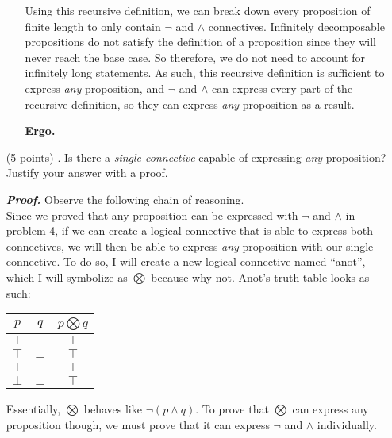 \documentclass[11pt,a4paper]{article}
\begin{document}
\begin{enumerate}
\begin{enumerate}
        Using this recursive definition, we can break down every proposition of finite length to only contain $\neg$ and $\land$ connectives. Infinitely decomposable propositions do not satisfy the definition of a proposition since they will never reach the base case. So therefore, we do not need to account for infinitely long statements. As such, this recursive definition is sufficient to express \emph{any} proposition, and $\neg$ and $\land$ can express every part of the recursive definition, so they can express \emph{any} proposition as a result.
        \begin{flushright}
            \textbf{Ergo.}
        \end{flushright}
        \end{enumerate}
    \item[(5 points) \quad 5.]
    Is there a \emph{single connective} capable of expressing \emph{any} proposition? Justify your answer with a proof.

    \emph{\textbf{Proof.}} Observe the following chain of reasoning. \\
    Since we proved that any proposition can be expressed with $\neg$ and $\land$ in problem 4, if we can create a logical connective that is able to express both connectives, we will then be able to express \emph{any} proposition with our single connective. To do so, I will create a new logical connective named ``anot'', which I will symbolize as $\bigotimes$ because why not. Anot's truth table looks as such: 
    \begin{center}
        \begin{tabular}{||c c c||}
            \hline
            $p$ & $q$ & $p \bigotimes q$ \\
            \hline \hline
            $\top$ & $\top$ & $\bot$ \\
            \hline
            $\top$ & $\bot$ & $\top$ \\
            \hline
            $\bot$ & $\top$ & $\top$ \\
            \hline
            $\bot$ & $\bot$ & $\top$ \\
            \hline
        \end{tabular}
    \end{center}    
    Essentially, $\bigotimes$ behaves like $\neg (p \land q)$. To prove that $\bigotimes$ can express any proposition though, we must prove that it can express $\neg$ and $\land$ individually.


\end{enumerate}
\end{document}
